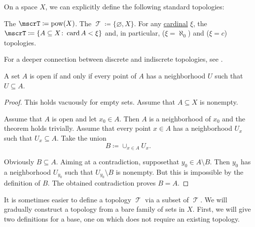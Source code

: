 \begin{definition}\label{def:standard_topologies}
  On a space \( X \), we can explicitly define the following standard topologies:
  \begin{thmenum}
     The  \( \mscrT \coloneqq \pow(X) \).
     The  \( \mscrT \coloneqq \{ \varnothing, X \} \).
     For any \hyperref[def:cardinal]{cardinal} \( \xi \), the  \( \mscrT \coloneqq \{ A \subseteq X \colon \card A < \xi \} \) and, in particular,  (\( \xi = \aleph_0 \)) and  (\( \xi = c \)) topologies.
  \end{thmenum}

  For a deeper connection between discrete and indiscrete topologies, see .
\end{definition}

\begin{proposition}\label{thm:set_open_iff_neighborhood_is_contained}
  A set \( A \) is open if and only if every point of \( A \) has a neighborhood \( U \) such that \( U \subseteq A \).
\end{proposition}
\begin{proof}
  This holds vacuously for empty sets. Assume that \( A \subseteq X \) is nonempty.

  \SufficiencySubProof Assume that \( A \) is open and let \( x_0 \in A \). Then \( A \) is a neighborhood of \( x_0 \) and the theorem holds trivially.
  \NecessitySubProof Assume that every point \( x \in A \) has a neighborhood \( U_x \) such that \( U_x \subseteq A \). Take the union
  \begin{equation*}
    B \coloneqq \cup_{x \in A} U_x.
  \end{equation*}

  Obviously \( B \subseteq A \). Aiming at a contradiction, suppose\DNE that \( y_0 \in A \setminus B \). Then \( y_0 \) has a neighborhood \( U_{y_0} \) such that \( U_{y_0} \setminus B \) is nonempty. But this is impossible by the definition of \( B \). The obtained contradiction proves \( B = A \).
\end{proof}

\begin{remark}\label{rem:abritrary_family_to_topology}
  It is sometimes easier to define a topology \( \mscrT \) via a subset of \( \mscrT \). We will gradually construct a topology from a bare family of sets in \( X \). First, we will give two definitions for a base, one on which does not require an existing topology.
\end{remark}


